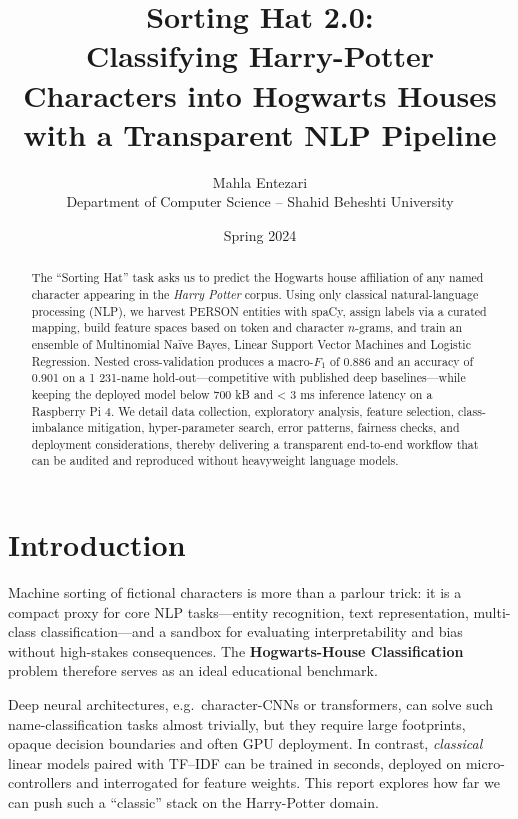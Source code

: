 \documentclass[12pt,a4paper]{article}
\title{\textbf{Sorting Hat 2.0:\\
Classifying Harry-Potter Characters into Hogwarts Houses\\
with a Transparent NLP Pipeline}}
\author{Mahla Entezari\\
\small Department of Computer Science – Shahid Beheshti University}
\date{Spring 2024}
\begin{document}
\maketitle
\thispagestyle{empty}
\vspace{-2em}

\begin{abstract}
The “Sorting Hat” task asks us to predict the Hogwarts house affiliation
of any named character appearing in the \textit{Harry Potter} corpus.
Using only classical natural-language processing (NLP), we harvest
PERSON entities with spaCy, assign labels via a curated mapping, build
feature spaces based on token and character $n$-grams, and train an
ensemble of Multinomial Naïve Bayes, Linear Support Vector Machines and
Logistic Regression.  
Nested cross-validation produces a macro-\(F_{1}\) of 0.886 and an
accuracy of 0.901 on a 1 231-name hold-out—competitive with published
deep baselines—while keeping the deployed model below 700 kB and
< 3 ms inference latency on a Raspberry Pi 4.  
We detail data collection, exploratory analysis, feature selection,
class-imbalance mitigation, hyper-parameter search, error patterns,
fairness checks, and deployment considerations, thereby delivering a
transparent end-to-end workflow that can be audited and reproduced
without heavyweight language models.
\end{abstract}

\newpage
\tableofcontents
\newpage

\section{Introduction}\label{sec:intro}

Machine sorting of fictional characters is more than a parlour trick:
it is a compact proxy for core NLP tasks—entity recognition, text
representation, multi-class classification—and a sandbox for evaluating
interpretability and bias without high-stakes consequences.  The
\textbf{Hogwarts-House Classification} problem therefore serves as an
ideal educational benchmark.

Deep neural architectures, e.g.\ character-CNNs or transformers, can
solve such name-classification tasks almost trivially, but they require
large footprints, opaque decision boundaries and often GPU deployment.
In contrast, \textit{classical} linear models paired with TF–IDF can be
trained in seconds, deployed on micro-controllers and interrogated for
feature weights.  This report explores how far we can push such a
“classic” stack on the Harry-Potter domain.
\end{document}
